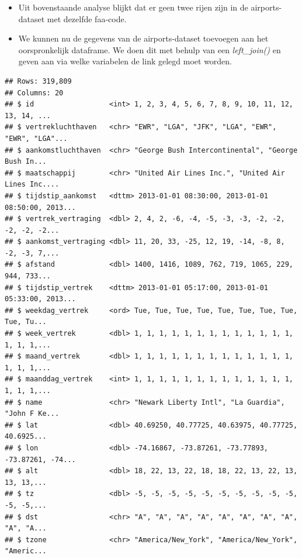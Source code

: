 \documentclass[]{tufte-book}
\newenvironment{Shaded}{}{}
\newcommand{\DataTypeTok}[1]{\textcolor[rgb]{0.56,0.13,0.00}{#1}}
\newcommand{\KeywordTok}[1]{\textcolor[rgb]{0.00,0.44,0.13}{\textbf{#1}}}
\newcommand{\NormalTok}[1]{#1}
\newcommand{\OperatorTok}[1]{\textcolor[rgb]{0.40,0.40,0.40}{#1}}
\newcommand{\StringTok}[1]{\textcolor[rgb]{0.25,0.44,0.63}{#1}}
\providecommand{\tightlist}{%
  \setlength{\itemsep}{0pt}\setlength{\parskip}{0pt}}
\begin{document}
\begin{itemize}
\tightlist
\item
  Uit bovenstaande analyse blijkt dat er geen twee rijen zijn in de airports-dataset met dezelfde faa-code.
\item
  We kunnen nu de gegevens van de airports-dataset toevoegen aan het oorspronkelijk dataframe. We doen dit met behulp van een \emph{left\_join()} en geven aan via welke variabelen de link gelegd moet worden.
\end{itemize}

\begin{Shaded}
\end{Shaded}

\begin{verbatim}
## Rows: 319,809
## Columns: 20
## $ id                  <int> 1, 2, 3, 4, 5, 6, 7, 8, 9, 10, 11, 12, 13, 14, ...
## $ vertrekluchthaven   <chr> "EWR", "LGA", "JFK", "LGA", "EWR", "EWR", "LGA"...
## $ aankomstluchthaven  <chr> "George Bush Intercontinental", "George Bush In...
## $ maatschappij        <chr> "United Air Lines Inc.", "United Air Lines Inc....
## $ tijdstip_aankomst   <dttm> 2013-01-01 08:30:00, 2013-01-01 08:50:00, 2013...
## $ vertrek_vertraging  <dbl> 2, 4, 2, -6, -4, -5, -3, -3, -2, -2, -2, -2, -2...
## $ aankomst_vertraging <dbl> 11, 20, 33, -25, 12, 19, -14, -8, 8, -2, -3, 7,...
## $ afstand             <dbl> 1400, 1416, 1089, 762, 719, 1065, 229, 944, 733...
## $ tijdstip_vertrek    <dttm> 2013-01-01 05:17:00, 2013-01-01 05:33:00, 2013...
## $ weekdag_vertrek     <ord> Tue, Tue, Tue, Tue, Tue, Tue, Tue, Tue, Tue, Tu...
## $ week_vertrek        <dbl> 1, 1, 1, 1, 1, 1, 1, 1, 1, 1, 1, 1, 1, 1, 1, 1,...
## $ maand_vertrek       <dbl> 1, 1, 1, 1, 1, 1, 1, 1, 1, 1, 1, 1, 1, 1, 1, 1,...
## $ maanddag_vertrek    <int> 1, 1, 1, 1, 1, 1, 1, 1, 1, 1, 1, 1, 1, 1, 1, 1,...
## $ name                <chr> "Newark Liberty Intl", "La Guardia", "John F Ke...
## $ lat                 <dbl> 40.69250, 40.77725, 40.63975, 40.77725, 40.6925...
## $ lon                 <dbl> -74.16867, -73.87261, -73.77893, -73.87261, -74...
## $ alt                 <dbl> 18, 22, 13, 22, 18, 18, 22, 13, 22, 13, 13, 13,...
## $ tz                  <dbl> -5, -5, -5, -5, -5, -5, -5, -5, -5, -5, -5, -5,...
## $ dst                 <chr> "A", "A", "A", "A", "A", "A", "A", "A", "A", "A...
## $ tzone               <chr> "America/New_York", "America/New_York", "Americ...
\end{verbatim}
\end{document}
